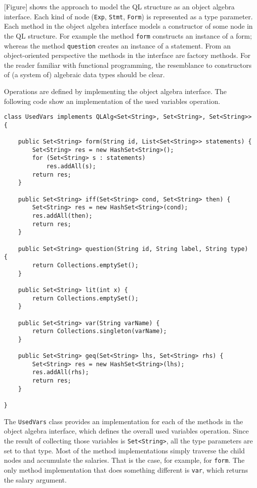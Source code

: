 [Figure] shows the approach to model the QL
structure as an object algebra interface. Each kind of node (\lstinline{Exp}, \lstinline{Stmt}, \lstinline{Form})
is represented as a type parameter. Each method in the object algebra interface models a
constructor of some node in the QL structure. For example the
method \lstinline{form} constructs an instance of a form; whereas the
method \lstinline{question} creates an instance of a statement. From an
object-oriented perspective the methods in the interface are factory
methods. For the reader familiar with functional programming, the
resemblance to constructors of  (a system of) algebraic data types should be clear.

Operations are defined by implementing the object algebra interface.
The following code show an implementation of the used variables
operation.

\begin{lstlisting}[numbers=none,mathescape=true]
class UsedVars implements QLAlg<Set<String>, Set<String>, Set<String>> {

	public Set<String> form(String id, List<Set<String>> statements) {
		Set<String> res = new HashSet<String>();
		for (Set<String> s : statements)
			res.addAll(s);
		return res;
	}

	public Set<String> iff(Set<String> cond, Set<String> then) {
		Set<String> res = new HashSet<String>(cond);
		res.addAll(then);
		return res;
	}

	public Set<String> question(String id, String label, String type) {
		return Collections.emptySet();
	}

	public Set<String> lit(int x) {
		return Collections.emptySet();
	}

	public Set<String> var(String varName) {
		return Collections.singleton(varName);
	}

	public Set<String> geq(Set<String> lhs, Set<String> rhs) {
		Set<String> res = new HashSet<String>(lhs);
		res.addAll(rhs);
		return res;
	}

}
\end{lstlisting}


The \lstinline{UsedVars} class provides an implementation for each
of the methods in the object algebra interface, which defines the
overall used variables operation. Since the result of collecting those
variables is \lstinline{Set<String>}, all the type parameters are set to
that type. Most of the method implementations simply traverse the
child nodes and accumulate the salaries. That is the case, for
example, for \lstinline{form}. The only method implementation that does
something different is \lstinline{var}, which returns the salary
argument.

